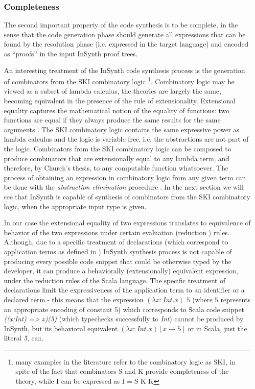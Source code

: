 \subsubsection{Completeness}

The second important property of the code synthesis is to be complete, in the sense that the code generation phase should generate all expressions that can be found by the resolution phase (i.e. expressed in the target language) and encoded as ``proofs'' in the input InSynth proof trees.

An interesting treatment of the InSynth code synthesis process is the generation of combinators from the SKI combinatory logic
\footnote{many examples in the literature refer to the combinatory logic as SKI, in spite of the fact that combinators S and K provide completeness of the theory, while I can be expressed as I = S K K}.
Combinatory logic may be viewed as a subset of lambda calculus, the theories are largely the same, becoming equivalent in the presence of the rule of extensionality.
Extensional equality captures the mathematical notion of the equality of functions: two functions are equal if they always produce the same results for the same arguments \cite{Tromp:Lambda}.
The SKI combinatory logic contains the same expressive power as lambda calculus and the logic is variable free, i.e. the abstractions are not part of the logic.
Combinators from the SKI combinatory logic can be composed to produce combinators that are extensionally equal to any lambda term, and therefore, by Church's thesis, to any computable function whatsoever.
The process of obtaining an expression in combinatory logic from any given \LC term can be done with the \textit{abstraction elimination} procedure \cite{Tromp:Lambda}.
In the next section we will see that InSynth is capable of synthesis of combinators from the SKI combinatory logic, when the appropriate input type is given.

In our case the extensional equality of two expressions translates to equivalence of behavior of the two expressions under certain evaluation (reduction \cite{Pierce:2002:TPL:509043}) rules.
Although, due to a specific treatment of declarations (which correspond to application terms as defined in \LC) InSynth synthesis process is not capable of producing every possible code snippet that could be otherwise typed by the developer, it can produce a behaviorally (extensionally) equivalent expression, under the reduction rules of the Scala language.
The specific treatment of declarations limit the expressiveness of the application term to an identifier or a declared term - this means that the expression $(\lambda x:Int. x) $ $5$ (where $5$ represents an appropriate \LC encoding of constant 5) which corresponds to Scala code snippet \textit{((x:Int) =\textgreater} \textit{x)(5)} (which typechecks successfully to \textit{Int}) cannot be produced by InSynth, but its behavioral equivalent $(\lambda x:Int. x)[x \rightarrow 5]$ or in Scala, just the literal \textit{5}, can.

